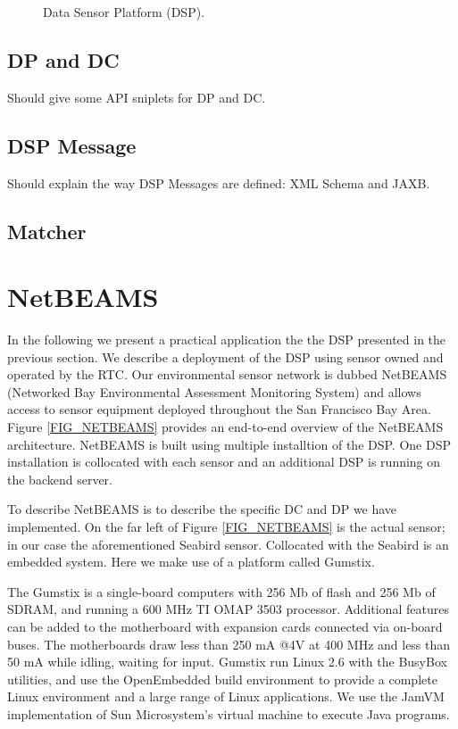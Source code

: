 \documentclass[conference]{IEEEtran}
\begin{document}
\begin{figure}
\centering
{}
\caption{\label{FIG_DSP} Data Sensor Platform (DSP).}
\end{figure}

\subsection{DP and DC}

Should give some API sniplets for DP and DC.

\subsection{DSP Message}

Should explain the way DSP Messages are defined: XML Schema and JAXB.

\subsection{Matcher}


\section{NetBEAMS}

In the following we present a practical application the the DSP
presented in the previous section. We describe a deployment of the DSP
using sensor owned and operated by the RTC. Our environmental sensor
network is dubbed NetBEAMS (Networked Bay Environmental Assessment
Monitoring System) and allows access to sensor equipment deployed
throughout the San Francisco Bay Area. Figure \ref{FIG_NETBEAMS}
provides an end-to-end overview of the NetBEAMS architecture. NetBEAMS
is built using multiple installtion of the DSP. One DSP installation
is collocated with each sensor and an additional DSP is running on the
backend server.

\begin{figure*}
\centering
{}
\caption{\label{FIG_NETBEAMS} NetBEAMS architecture.}
\end{figure*}

To describe NetBEAMS is to describe the specific DC and DP we have
implemented. On the far left of Figure \ref{FIG_NETBEAMS} is the
actual sensor; in our case the aforementioned Seabird sensor.
Collocated with the Seabird is an embedded system. Here we make use of
a platform called Gumstix. 

The Gumstix is a single-board computers with 256 Mb of flash and 256
Mb of SDRAM, and running a 600 MHz TI OMAP 3503 processor. Additional
features can be added to the motherboard with expansion cards
connected via on-board buses. The motherboards draw less than 250 mA
@4V at 400 MHz and less than 50 mA while idling, waiting for input.
Gumstix run Linux 2.6 with the BusyBox utilities, and use the
OpenEmbedded build environment to provide a complete Linux
environment and a large range of Linux applications. We use the JamVM
implementation of Sun Microsystem's virtual machine to execute Java
programs. 
\end{document}
